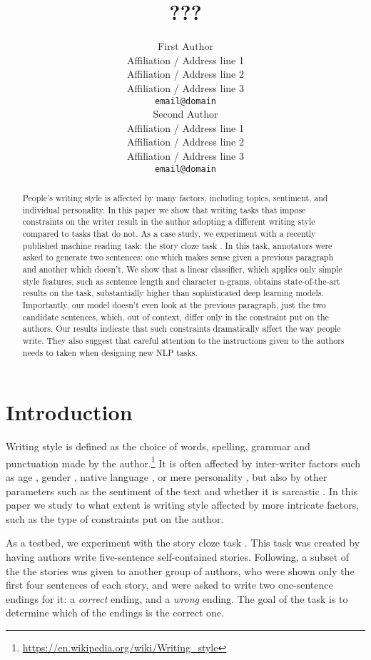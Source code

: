 \documentclass[11pt,a4paper]{article}
\title{???}
\author{First Author \\
  Affiliation / Address line 1 \\
  Affiliation / Address line 2 \\
  Affiliation / Address line 3 \\
  {\tt email@domain} \\\And
  Second Author \\
  Affiliation / Address line 1 \\
  Affiliation / Address line 2 \\
  Affiliation / Address line 3 \\
  {\tt email@domain} \\}
\date{}
\begin{document}
\maketitle
\begin{abstract}
People's writing style is affected by many factors, including topics, sentiment, and individual personality. 
In this paper we show that writing tasks that impose constraints on the writer result in the author adopting a  different writing style compared to tasks that do not.
As a case study, we experiment with a recently published machine reading task: the story cloze task \cite{Mostafazadeh:2016}. 
In this task, annotators were asked to generate two sentences: one which makes sense given a previous paragraph and another which doesn't.
We show that a linear classifier, which applies only simple style features, such as sentence length and character n-grams, obtains state-of-the-art results on the task,
substantially higher than sophisticated deep learning models.
Importantly, our model doesn't even look at the previous paragraph, just the two candidate sentences, which, out of context, differ only in the constraint put on the authors. 
Our results indicate that such constraints dramatically affect the way people write. 
They also suggest that careful attention to the instructions given to the authors needs to taken when designing new NLP tasks.

\end{abstract}

\section{Introduction}
Writing style is defined as the choice of words, spelling, grammar and punctuation made by the author.\footnote{\url{https://en.wikipedia.org/wiki/Writing_style}}
It is often affected by inter-writer factors such as age \cite{Schler:2006}, gender \cite{Argamon:2003}, native language \cite{Koppel:2005}, or mere personality \cite{Stamatatos:2009}, but also by other parameters such as the sentiment of the text \cite{Davidov:2010} and whether it is sarcastic \cite{Tsur:2010}.  
In this paper we study to what extent is writing style affected by more intricate factors, such as the type of constraints put on the author. 

As a testbed, we experiment with the story cloze task \cite{Mostafazadeh:2016}. 
This task was created by having authors write five-sentence self-contained stories.
Following, a subset of the the stories was given to another group of authors, who were shown only the first four sentences of each story, 
and were asked to write two one-sentence endings for it: a {\it correct} ending, and a {\it wrong} ending.
The goal of the task is to determine which of the endings is the correct one.
\end{document}
